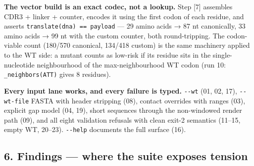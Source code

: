 \documentclass[12pt,a4paper]{article}
\begin{document}
\textbf{The vector build is an exact codec, not a lookup.} Step {[}7{]}
assembles CDR3 + linker + counter, encodes it using the first codon of
each residue, and asserts \texttt{translate(dna)\ ==\ payload} --- 29
amino acids → 87 nt canonically, 33 amino acids → 99 nt with the custom
counter, both round-tripping. The codon-viable count (180/570 canonical,
134/418 custom) is the same machinery applied to the WT side: a mutant
counts as low-risk if its residue sits in the single-nucleotide
neighbourhood of the max-neighbourhood WT codon (run 10:
\texttt{\_neighbors(\textquotesingle{}ATT\textquotesingle{})} gives 8
residues).

\textbf{Every input lane works, and every failure is typed.}
\texttt{-\/-wt} (01, 02, 17), \texttt{-\/-wt-file} FASTA with header
stripping (08), contact overrides with ranges (03), explicit gap model
(04, 19), short sequences through the non-windowed render path (09), and
all eight validation refusals with clean exit-2 semantics (11--15, empty
WT, 20--23). \texttt{-\/-help} documents the full surface (16).

\hypertarget{findings-where-the-suite-exposes-tension}{%
\subsection{6. Findings --- where the suite exposes
tension}\label{findings-where-the-suite-exposes-tension}}
\end{document}
